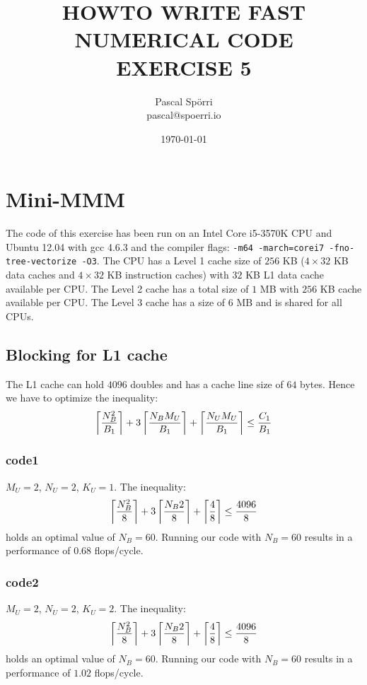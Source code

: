 \documentclass[portrait,a4paper]{article}
\begin{document}
 \author{Pascal Spörri\\pascal@spoerri.io}
 \title{HOWTO WRITE FAST NUMERICAL CODE\\ EXERCISE 5}
 \date{\today}
\maketitle

\section{Mini-MMM}
The code of this exercise has been run on an Intel Core i5-3570K CPU and Ubuntu 12.04 with gcc 4.6.3 and the compiler flags: \lstinline{-m64 -march=corei7 -fno-tree-vectorize -O3}. The CPU has a Level 1 cache size of $256$ KB ($4\times 32$ KB data caches and $4\times 32$ KB instruction caches) with $32$ KB L1 data cache available per CPU. The Level 2 cache has a total size of $1$ MB with $256$ KB cache available per CPU. The Level 3 cache has a size of $6$ MB and is shared for all CPUs.

\subsection{Blocking for L1 cache}
The L1 cache can hold $4096$ doubles and has a cache line size of $64$ bytes. Hence we have to optimize the inequality:
\begin{align*}
    \left\lceil {N_B^2 \over B_1} \right\rceil + 3\left\lceil {N_B M_U \over B_1} \right\rceil
    + \left\lceil {N_U M_U \over B_1} \right\rceil \leq {C_1 \over B_1}
\end{align*}


\subsubsection{code1}
$M_U=2$, $N_U=2$, $K_U=1$. The inequality:
\begin{align*}
    \left\lceil {N_B^2 \over 8} \right\rceil + 3\left\lceil {N_B 2 \over 8} \right\rceil
    + \left\lceil {4 \over 8} \right\rceil \leq {4096 \over 8}
\end{align*}
holds an optimal value of $N_B=60$.  Running our code with $N_B=60$ results in a performance of $0.68$ flops/cycle.
\subsubsection{code2}
$M_U=2$, $N_U=2$, $K_U=2$. The inequality:
\begin{align*}
    \left\lceil {N_B^2 \over 8} \right\rceil + 3\left\lceil {N_B 2 \over 8} \right\rceil
    + \left\lceil {4\over 8} \right\rceil \leq {4096 \over 8}
\end{align*}
holds an optimal value of $N_B=60$. Running our code with $N_B=60$ results in a performance of $1.02$ flops/cycle.
\end{document}
